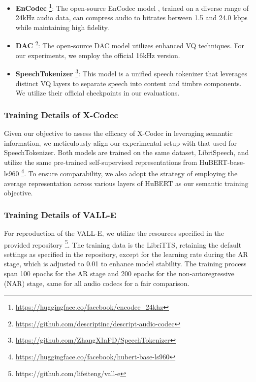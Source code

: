 \begin{itemize}
\item \textbf{EnCodec} \footnote{\url{https://huggingface.co/facebook/encodec\_24khz}}: The open-source EnCodec model \cite{defossez2022high}, trained on a diverse range of 24kHz audio data, can compress audio to bitrates between 1.5 and 24.0 kbps while maintaining high fidelity.
\item \textbf{DAC} \footnote{\url{https://github.com/descriptinc/descript-audio-codec}}: The open-source DAC model \cite{kumar2024high} utilizes enhanced VQ techniques. For our experiments, we employ the official 16kHz version.
\item \textbf{SpeechTokenizer} \footnote{\url{https://github.com/ZhangXInFD/SpeechTokenizer}}: This model \cite{zhang2023speechtokenizer} is a unified speech tokenizer that leverages distinct VQ layers to separate speech into content and timbre components. We utilize their official checkpoints in our evaluations.
\end{itemize}
 
\subsubsection{Training Details of X-Codec}
Given our objective to assess the efficacy of X-Codec in leveraging semantic information, we meticulously align our experimental setup with that used for SpeechTokenizer. Both models are trained on the same dataset, LibriSpeech, and utilize the same pre-trained self-supervised representations from HuBERT-base-ls960 \footnote{\url{https://huggingface.co/facebook/hubert-base-ls960}}. To ensure comparability, we also adopt the strategy of employing the average representation across various layers of HuBERT as our semantic training objective.

\subsubsection{Training Details of VALL-E}
For reproduction of the VALL-E, we utilize the resources specified in the provided repository \footnote{https://github.com/lifeiteng/vall-e}. The training data is the LibriTTS, retaining the default settings as specified in the repository, except for the learning rate during the AR stage, which is adjusted to 0.01 to enhance model stability. The training process span 100 epochs for the AR stage and 200 epochs for the non-autoregressive (NAR) stage, same for all audio codecs for a fair comparison.



